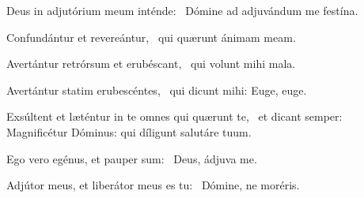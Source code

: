 \item Deus in adjutórium meum inténde:~\psstar{} Dómine ad adjuvándum me festína.

\item Confundántur et revereán\-tur,~\psstar{} qui quærunt ánimam meam.

\item Avertántur retrórsum et erubéscant,~\psstar{} qui volunt mihi mala.

\item Avertántur statim erubescén\-tes,~\psstar{} qui dicunt mihi: Euge, euge.

\item Exsúltent et læténtur in te omnes qui quærunt te,~\psstar{} et dicant semper: Magnificétur Dóminus: qui díligunt salutáre tuum.

\item Ego vero egénus, et pauper sum:~\psstar{} Deus, ádjuva me.

\item Adjútor meus, et liberátor meus es tu:~\psstar{} Dómine, ne moréris.

